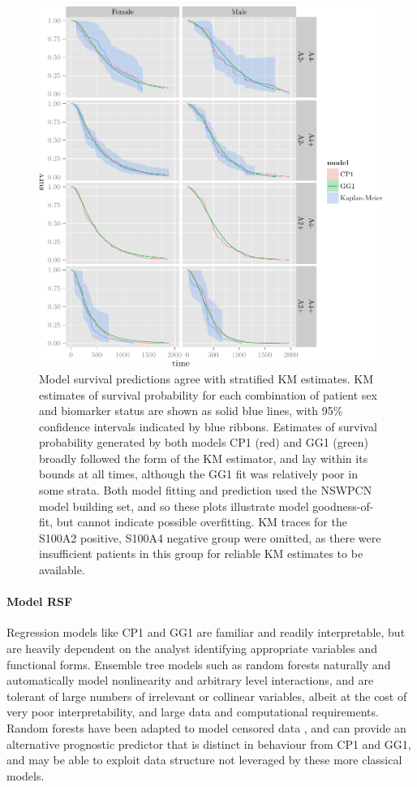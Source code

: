 \documentclass[dissertation.tex]{subfiles}
\begin{document}
\begin{figure}
\centering
  \includegraphics[width=.7\linewidth]{analysis/nomogram/figure/05-final-fit-assessment-4-2}
  \caption[Model survival predictions agree with stratified \acrshort{KM} estimates]{Model survival predictions agree with stratified \gls{KM} estimates.  \gls{KM} estimates of survival probability for each combination of patient sex and biomarker status are shown as solid blue lines, with 95\% confidence intervals indicated by blue ribbons.  Estimates of survival probability generated by both models CP1 (red) and GG1 (green) broadly followed the form of the \gls{KM} estimator, and lay within its bounds at all times, although the GG1 fit was relatively poor in some strata.  Both model fitting and prediction used the \gls{NSWPCN} model building set, and so these plots illustrate model goodness-of-fit, but cannot indicate possible overfitting.  \gls{KM} traces for the S100A2 positive, S100A4 negative group were omitted, as there were insufficient patients in this group for reliable \gls{KM} estimates to be available.}
\label{fig:nomo-cp1-gg1-fitplot}
\end{figure}

\paragraph{Model RSF}
Regression models like CP1 and GG1 are familiar and readily interpretable, but are heavily dependent on the analyst identifying appropriate variables and functional forms.  Ensemble tree models such as random forests \cite{Breiman2001} naturally and automatically model nonlinearity and arbitrary level interactions, and are tolerant of large numbers of irrelevant or collinear variables, albeit at the cost of very poor interpretability, and large data and computational requirements.  Random forests have been adapted to model censored data \cite{Ishwaran2008}, and can provide an alternative prognostic predictor that is distinct in behaviour from CP1 and GG1, and may be able to exploit data structure not leveraged by these more classical models.
\end{document}
